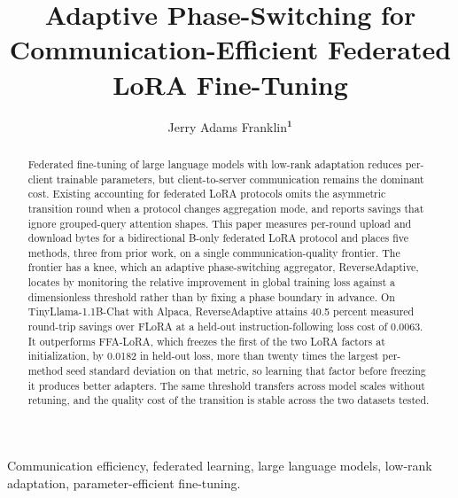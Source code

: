 \documentclass{ieeetj}
\def\authorrefmark#1{\ensuremath{^{\textbf{#1}}}}
\begin{document}


\title{Adaptive Phase-Switching for Communication-Efficient Federated LoRA Fine-Tuning}

\author{Jerry Adams Franklin\authorrefmark{1}}

\begin{abstract}
Federated fine-tuning of large language models with low-rank adaptation
reduces per-client trainable parameters, but client-to-server communication
remains the dominant cost. Existing accounting for federated LoRA protocols
omits the asymmetric transition round when a protocol changes aggregation
mode, and reports savings that ignore grouped-query attention shapes. This
paper measures per-round upload and download bytes for a bidirectional
B-only federated LoRA protocol and places five methods, three from prior work,
on a single
communication-quality frontier. The frontier has a knee, which an adaptive
phase-switching aggregator, ReverseAdaptive, locates by monitoring the relative improvement in global training loss against
a dimensionless threshold rather than by fixing a phase boundary in advance.
On TinyLlama-1.1B-Chat with Alpaca, ReverseAdaptive attains 40.5 percent
measured round-trip savings over FLoRA at a held-out instruction-following
loss cost of 0.0063. It outperforms FFA-LoRA, which freezes the first of the
two LoRA factors at initialization, by 0.0182 in held-out loss, more than
twenty times the largest per-method seed standard deviation on that metric,
so learning that factor before freezing it produces better adapters. The same
threshold transfers across model scales without retuning, and the quality cost
of the transition is stable across the two datasets tested.
\end{abstract}

\begin{IEEEkeywords}
Communication efficiency, federated learning, large language models, low-rank adaptation, parameter-efficient fine-tuning.
\end{IEEEkeywords}
\end{document}
